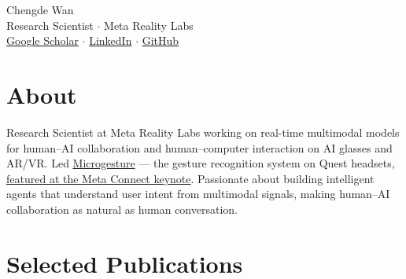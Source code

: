 \documentclass[10pt, letterpaper]{article}
\begin{document}
\begin{center}
  {\fontsize{22}{22}\selectfont Chengde Wan}\\[5pt]
  {\small Research Scientist $\cdot$ Meta Reality Labs}\\[4pt]
  {\small
    \href{https://scholar.google.com/citations?user=bm5dZwIAAAAJ&hl=en}{Google Scholar}
    \enspace$\cdot$\enspace
    \href{https://www.linkedin.com/in/chengde-wan-0417a7a3/}{LinkedIn}
    \enspace$\cdot$\enspace
    \href{https://github.com/melonwan}{GitHub}
  }
\end{center}

\vspace{4pt}

\section{About}
{\small
  Research Scientist at Meta Reality Labs working on real-time multimodal models for human--AI
  collaboration and human--computer interaction on AI glasses and AR/VR\@.
  Led \href{https://developers.meta.com/horizon/design/design-microgestures/}{Microgesture}
  --- the gesture recognition system on Quest headsets,
  \href{https://www.youtube.com/watch?v=ztl25aRlnWE&t=1212s}{featured at the Meta Connect keynote}.
  Passionate about building intelligent agents that understand user intent from multimodal signals,
  making human--AI collaboration as natural as human conversation.
}

\vspace{2pt}

\section{Selected Publications}
\end{document}
